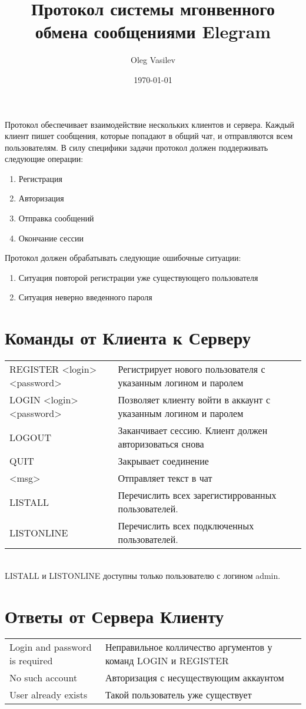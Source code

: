 \documentclass[a4paper, 10pt]{article}
\title{Протокол системы мгонвенного обмена сообщениями Elegram}
\date{\today}
\author{Oleg Vasilev}
\begin{document}
\maketitle

Протокол обеспечивает взаимодействие нескольких клиентов и сервера. Каждый клиент пишет сообщения, которые попадают в общий чат, и отправляются всем пользователям. 
В силу специфики задачи протокол должен поддерживать следующие операции:
\begin{enumerate}
\item Регистрация
\item Авторизация
\item Отправка сообщений
\item Окончание сессии
\end{enumerate} 
Протокол должен обрабатывать следующие ошибочные ситуации:
\begin{enumerate}
\item Ситуация повторой регистрации уже существующего пользователя 
\item Ситуация неверно введенного пароля
\end{enumerate}

\section{Команды от Клиента к Серверу}
\begin{tabular}{ll}
REGISTER <login> <password> & Регистрирует нового пользователя с указанным логином и паролем \\
LOGIN <login> <password> & Позволяет клиенту войти в аккаунт с указанным логином и паролем \\
LOGOUT &  Заканчивает сессию. Клиент должен авторизоваться снова\\
QUIT & Закрывает соединение \\
<msg> & Отправляет текст в чат \\
LISTALL & Перечислить всех зарегистиррованных пользователей. \\ 
LISTONLINE & Перечислить всех подключенных пользователей. \\ 
\end{tabular}
\\
LISTALL и LISTONLINE доступны только пользователю с логином admin. 
\section{Ответы от Сервера Клиенту}
\begin{tabular}{ll}
Login and password is required & Неправильное колличество аргументов у команд LOGIN и REGISTER \\ 
No such account & Авторизация с несуществующим аккаунтом \\ 
User already exists & Такой пользователь уже существует \\ 
\end{tabular}
\end{document}
